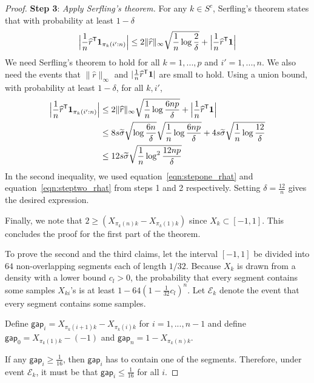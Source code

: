\begin{proof}
\vskip5pt
\textbf{Step 3}: {\it Apply Serfling's theorem.}  
For any $k \in S^c$, Serfling's theorem states that with probability at least $1 - \delta$
\begin{align*}
\Big
|\frac{1}{n} \widehat{r}^{\mathsf{T}} \mbox{\boldmath $1$}_{\pi_k(i':n)}\Big| \leq
   2\| \widehat{r} \|_\infty \sqrt{ \frac{1}{n} \log \frac{2}{\delta}} + 
   \Big|\frac{1}{n} \widehat{r}^{\mathsf{T}} \mbox{\boldmath $1$} \Big|
\end{align*}
We need Serfling's theorem to hold for all $k = 1,...,p$ and $i' =
1,...,n$. We also need the events that $\|\hat{r}\|_\infty$ and $|
\frac{1}{n} \widehat{r}^{\mathsf{T}} \mbox{\boldmath $1$}|$ are small to hold. Using a
union bound, with probability at least $1-\delta$, for all $k,i'$,
\begin{align*}
\Big
|\frac{1}{n} \widehat{r}^{\mathsf{T}} \mbox{\boldmath $1$}_{\pi_k(i':n)}\Big| &\leq
   2\| \widehat{r} \|_\infty \sqrt{ \frac{1}{n} \log \frac{6np}{\delta}} + 
   \Big|\frac{1}{n} \widehat{r}^{\mathsf{T}} \mbox{\boldmath $1$} \Big|\\
  &\leq 8 s\widetilde{\sigma}\sqrt{\log \frac{6n}{\delta}} \sqrt{\frac{1}{n}\log \frac{6np}{\delta}} + 4 s \widetilde{\sigma} \sqrt{\frac{1}{n}\log \frac{12}{\delta}} \\
  &\leq 12 s\widetilde{\sigma} \sqrt{ \frac{1}{n} \log^2 \frac{12np}{\delta}}
\end{align*}
In the second inequality, we used equation~\eqref{eqn:stepone_rhat}
and equation~\eqref{eqn:steptwo_rhat} from steps 1 and 2
respectively. Setting $\delta = \frac{12}{n}$ gives the desired expression.

Finally, we note that $2 \geq (X_{\pi_k(n)k} - X_{\pi_k(1)k})$ since $X_k \subset [-1,1]$. This concludes the proof for the first part of the theorem. 

To prove the second and the third claims, let the interval $[-1, 1]$ be divided into $64$ non-overlapping segments each of length $1/32$. Because $X_k$ is drawn from a density with a lower bound $c_l > 0$, the probability that every segment contains some samples $X_{ki}$'s is at least $1-64 \left( 1 - \frac{1}{32} c_l \right)^n$. Let $\mathcal{E}_k$ denote the event that every segment contains some samples. 

Define $\mathsf{gap}_i = X_{\pi_k(i+1)k} - X_{\pi_k(i)k}$ for $i=1,...,n-1$ and define $\mathsf{gap}_0 = X_{\pi_k(1)k} - (-1)$ and $\mathsf{gap}_{n} = 1 - X_{\pi_k(n)k}$. 

If any $\mathsf{gap}_i \geq \frac{1}{16}$, then $\mathsf{gap}_i$ has to contain one of the segments. Therefore, under event $\mathcal{E}_k$, it must be that $\mathsf{gap}_i \leq \frac{1}{16}$ for all $i$.


\end{proof}
